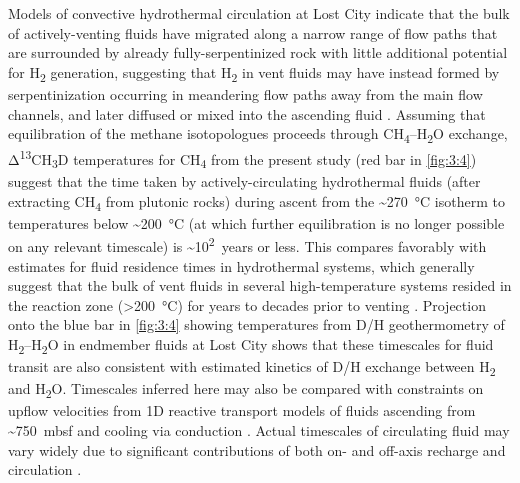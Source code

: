 Models of convective hydrothermal circulation at Lost City indicate that
the bulk of actively-venting fluids have migrated along a narrow range
of flow paths that are surrounded by already fully-serpentinized rock
with little additional potential for H\textsubscript{2} generation,
suggesting that H\textsubscript{2} in vent fluids may have instead
formed by serpentinization occurring in meandering flow paths away from
the main flow channels, and later diffused or mixed into the ascending
fluid \parencite{Titarenko+McCaig_2016_Gf}. Assuming that equilibration of the
methane isotopologues proceeds through
CH\textsubscript{4}--H\textsubscript{2}O exchange,
Δ\textsuperscript{13}CH\textsubscript{3}D temperatures for
CH\textsubscript{4} from the present study (red bar in \autoref{fig:3:4}) suggest
that the time taken by actively-circulating hydrothermal fluids (after
extracting CH\textsubscript{4} from plutonic rocks) during ascent from
the \textasciitilde{}270~°C isotherm to temperatures below
\textasciitilde{}200~°C (at which further equilibration is no longer
possible on any relevant timescale) is
\textasciitilde{}10\textsuperscript{2}~years or less. This compares
favorably with estimates for fluid residence times in hydrothermal
systems, which generally suggest that the bulk of vent fluids in several
high-temperature systems resided in the reaction zone
(\textgreater{}200~°C) for years to decades prior to venting \parencite{Kadko_1996,Fisher_2003}. Projection onto the blue bar in \autoref{fig:3:4} showing
temperatures from D/H geothermometry of
H\textsubscript{2}--H\textsubscript{2}O in endmember fluids at Lost City
\parencite{Proskurowski++_2006_CG} shows that these timescales for fluid
transit are also consistent with estimated kinetics of D/H exchange
between H\textsubscript{2} and H\textsubscript{2}O. Timescales inferred
here may also be compared with constraints on upflow velocities from 1D
reactive transport models of fluids ascending from
\textasciitilde{}750~mbsf and cooling via conduction \parencite{Seyfried++_2015_GCA}. Actual timescales of circulating
fluid may vary widely due to significant contributions of both on- and
off-axis recharge and circulation \parencite{Hasenclever++_2014_N}.

